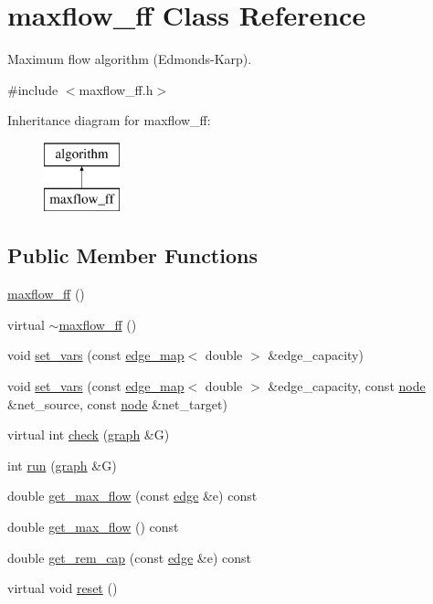 \hypertarget{classmaxflow__ff}{}\section{maxflow\+\_\+ff Class Reference}
\label{classmaxflow__ff}


Maximum flow algorithm (Edmonds-\/\+Karp).  




{\ttfamily \#include $<$maxflow\+\_\+ff.\+h$>$}

Inheritance diagram for maxflow\+\_\+ff\+:\begin{figure}[H]
\begin{center}
\leavevmode
\includegraphics[height=2.000000cm]{classmaxflow__ff}
\end{center}
\end{figure}
\subsection*{Public Member Functions}
\begin{DoxyCompactItemize}
\item 
\mbox{\hyperlink{classmaxflow__ff_a47280ecd91e227e529455249ee390ca3}{maxflow\+\_\+ff}} ()
\item 
virtual \mbox{\hyperlink{classmaxflow__ff_ae1c3c5ba0b8c55cdba429ee906bce7d9}{$\sim$maxflow\+\_\+ff}} ()
\item 
void \mbox{\hyperlink{classmaxflow__ff_ad2485a4c093dbcfa045d1e6e5d78f533}{set\+\_\+vars}} (const \mbox{\hyperlink{classedge__map}{edge\+\_\+map}}$<$ double $>$ \&edge\+\_\+capacity)
\item 
void \mbox{\hyperlink{classmaxflow__ff_a1e715030d70080e0c9ecf118dd81e8f6}{set\+\_\+vars}} (const \mbox{\hyperlink{classedge__map}{edge\+\_\+map}}$<$ double $>$ \&edge\+\_\+capacity, const \mbox{\hyperlink{classnode}{node}} \&net\+\_\+source, const \mbox{\hyperlink{classnode}{node}} \&net\+\_\+target)
\item 
virtual int \mbox{\hyperlink{classmaxflow__ff_a4d0deee7d70bac4c9dad942341d87e37}{check}} (\mbox{\hyperlink{classgraph}{graph}} \&G)
\item 
int \mbox{\hyperlink{classmaxflow__ff_a0a4391b9093d6966b47c023a555099e2}{run}} (\mbox{\hyperlink{classgraph}{graph}} \&G)
\item 
double \mbox{\hyperlink{classmaxflow__ff_a4c120a7ea9be23d908036ebd2fb9298c}{get\+\_\+max\+\_\+flow}} (const \mbox{\hyperlink{classedge}{edge}} \&e) const
\item 
double \mbox{\hyperlink{classmaxflow__ff_a04d1ea509c13e500b62cad061ee8a2b9}{get\+\_\+max\+\_\+flow}} () const
\item 
double \mbox{\hyperlink{classmaxflow__ff_a3b66acf996ff5be94de8b2cfdb3164c3}{get\+\_\+rem\+\_\+cap}} (const \mbox{\hyperlink{classedge}{edge}} \&e) const
\item 
virtual void \mbox{\hyperlink{classmaxflow__ff_a893e5136d4f7f1d4b67ef5b67306d17b}{reset}} ()
\end{DoxyCompactItemize}
